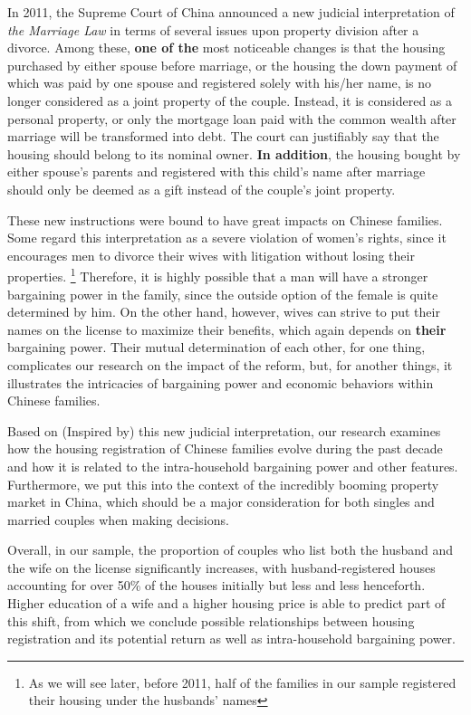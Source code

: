 \documentclass[11pt]{article}
\begin{document}
In 2011, the Supreme Court of China announced a new judicial interpretation of \textit{the Marriage Law} in terms of several issues upon property division after a divorce. Among these, \textbf{one of the} most noticeable changes is that the housing purchased by either spouse before marriage, or the housing the down payment of which was paid by one spouse and registered solely with his/her name, is no longer considered as a joint property of the couple. Instead, it is considered as a personal property, or only the mortgage loan paid with the common wealth after marriage will be transformed into debt. The court can justifiably say that the housing should belong to its nominal owner. \textbf{In addition}, the housing bought by either spouse's parents and registered with this child's name after marriage should only be deemed as a gift instead of the couple's joint property.

These new instructions were bound to have great impacts on Chinese families. Some regard this interpretation as a severe violation of women's rights, since it encourages men to divorce their wives with litigation without losing their properties. \footnote{As we will see later, before 2011, half of the families in our sample registered their housing under the husbands' names} Therefore, it is highly possible that a man will have a stronger bargaining power in the family, since the outside option of the female is quite determined by him. On the other hand, however, wives can strive to put their names on the license to maximize their benefits, which again depends on \textbf{their} bargaining power. Their mutual determination of each other, for one thing, complicates our research on the impact of the reform, but, for another things, it illustrates the intricacies of bargaining power and economic behaviors within Chinese families.

Based on (Inspired by) this new judicial interpretation, our research examines how the housing registration of Chinese families evolve during the past decade and how it is related to the intra-household bargaining power and other features. Furthermore, we put this into the context of the incredibly booming property market in China, which should be a major consideration for both singles and married couples when making decisions.

Overall, in our sample, the proportion of couples who list both the husband and the wife on the license significantly increases, with husband-registered houses accounting for over 50\% of the houses initially but less and less henceforth. Higher education of a wife and a higher housing price is able to predict part of this shift, from which we conclude possible relationships between housing registration and its potential return as well as intra-household bargaining power.
\end{document}
